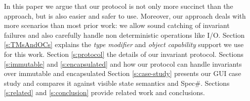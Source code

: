 In this paper we argue that our protocol is not only more succinct than the  approach, but is also easier and safer to use.
Moreover, our approach deals with more scenarios than most prior work: we allow sound catching of invariant failures\IODel{,} and also carefully handle non deterministic operations like I/O.
Section \ref{s:TMsAndOCs} explains the \emph{type modifier} and \emph{object capability} support we use for this work.
Section \ref{s:protocol}  the details of our invariant protocol.
Sections \ref{s:immutable} and \ref{s:encapsulated} and  how our protocol can handle invariants over immutable and encapsulated 
Section \ref{s:case-study} presents our GUI case study and compares it against visible state semantics and Spec\#.
Sections \ref{s:related} and \ref{s:conclusion} provide related work and conclusions.



